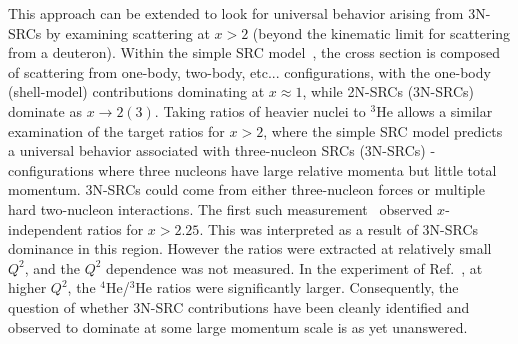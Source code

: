 This approach can be extended to look for universal behavior arising from 3N-SRCs by examining scattering at
$x>2$ (beyond the kinematic limit for scattering from a deuteron). Within the simple SRC
model~\cite{Frankfurt1981215}, the cross section is composed of scattering from one-body, two-body,
etc... configurations, with the one-body (shell-model) contributions dominating at $x \approx 1$, while
2N-SRCs (3N-SRCs) dominate as $x \to 2 (3)$. Taking ratios of heavier nuclei to $^3$He allows a similar
examination of the target ratios for $x>2$, where the simple SRC model predicts a universal behavior
associated with three-nucleon SRCs (3N-SRCs) - configurations where three nucleons have large relative
momenta but little total momentum. 3N-SRCs could come from either three-nucleon forces or multiple hard
two-nucleon interactions. The first such measurement~\cite{PhysRevLett.96.082501} observed $x$-independent
ratios for $x > 2.25$. This was interpreted as a result of 3N-SRCs dominance in this region.
However the ratios were extracted at relatively small $Q^2$, and the $Q^2$ dependence was not measured. In the experiment of Ref.~\cite{fomin2012}, at higher $Q^2$, the $^4$He/$^3$He ratios  were significantly
larger. Consequently, the question of whether 3N-SRC contributions have been cleanly identified and observed
to dominate at some large momentum scale is as yet unanswered.

%



